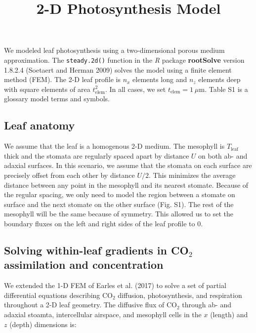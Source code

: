 \documentclass[
  letterpaper,
  DIV=11,
  numbers=noendperiod]{scrartcl}
\title{2-D Photosynthesis Model}
\author{}
\date{}
\begin{document}
\maketitle
\ifdefined\Shaded\renewenvironment{Shaded}{\begin{tcolorbox}[interior hidden, boxrule=0pt, sharp corners, breakable, frame hidden, enhanced, borderline west={3pt}{0pt}{shadecolor}]}{\end{tcolorbox}}\fi

We modeled leaf photosynthesis using a two-dimensional porous medium
approximation. The \texttt{steady.2d()} function in the \emph{R} package
\textbf{rootSolve} version 1.8.2.4 (Soetaert and Herman 2009) solves the
model using a finite element method (FEM). The 2-D leaf profile is
\(n_x\) elements long and \(n_z\) elements deep with square elements of
area \(t_\text{elem}^2\). In all cases, we set
\(t_\text{elem} = 1~\mu \text{m}\). Table S1 is a glossary model terms
and symbols.

\hypertarget{leaf-anatomy}{%
\subsection{Leaf anatomy}\label{leaf-anatomy}}

We assume that the leaf is a homogenous 2-D medium. The mesophyll is
\(T_\text{leaf}\) thick and the stomata are regularly spaced apart by
distance \(U\) on both ab- and adaxial surfaces. In this scenario, we
assume that the stomata on each surface are precisely offset from each
other by distance \(U/2\). This minimizes the average distance between
any point in the mesophyll and its nearest stomate. Because of the
regular spacing, we only need to model the region between a stomate on
surface and the next stomate on the other surface (Fig. S1). The rest of
the mesophyll will be the same because of symmetry. This allowed us to
set the boundary fluxes on the left and right sides of the leaf profile
to 0.

\hypertarget{solving-within-leaf-gradients-in-co_2-assimilation-and-concentration}{%
\subsection{\texorpdfstring{Solving within-leaf gradients in CO\(_2\)
assimilation and
concentration}{Solving within-leaf gradients in CO\_2 assimilation and concentration}}\label{solving-within-leaf-gradients-in-co_2-assimilation-and-concentration}}

We extended the 1-D FEM of Earles et al. (2017) to solve a set of
partial differential equations describing CO\(_2\) diffusion,
photosynthesis, and respiration throughout a 2-D leaf geometry. The
diffusive flux of CO\(_2\) through ab- and adaxial stoamta,
intercellular airspace, and mesophyll cells in the \(x\) (length) and
\(z\) (depth) dimensions is:
\end{document}
